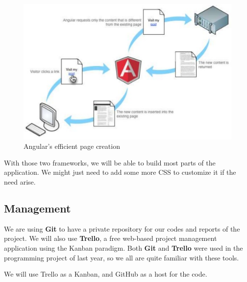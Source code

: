 \begin{figure}
	\centering
	\includegraphics[width=0.85\linewidth]{AngularEfficiency.png}
	\caption{Angular's efficient page creation}
	\label{fig:length_eight_mouse}
\end{figure}

With those two frameworks, we will be able to build most parts of the application. We might just need to add some more CSS to customize it if the need arise.

\subsection{Management}

We are using \textbf{Git} to have a private repository for our codes and reports of the project. We will also use \textbf{Trello}, a free web-based project management application using the Kanban paradigm. Both \textbf{Git} and \textbf{Trello} were used in the programming project of last year, so we all are quite familiar with these tools.

We will use Trello as a Kanban, and GitHub as a host for the code. \newline
